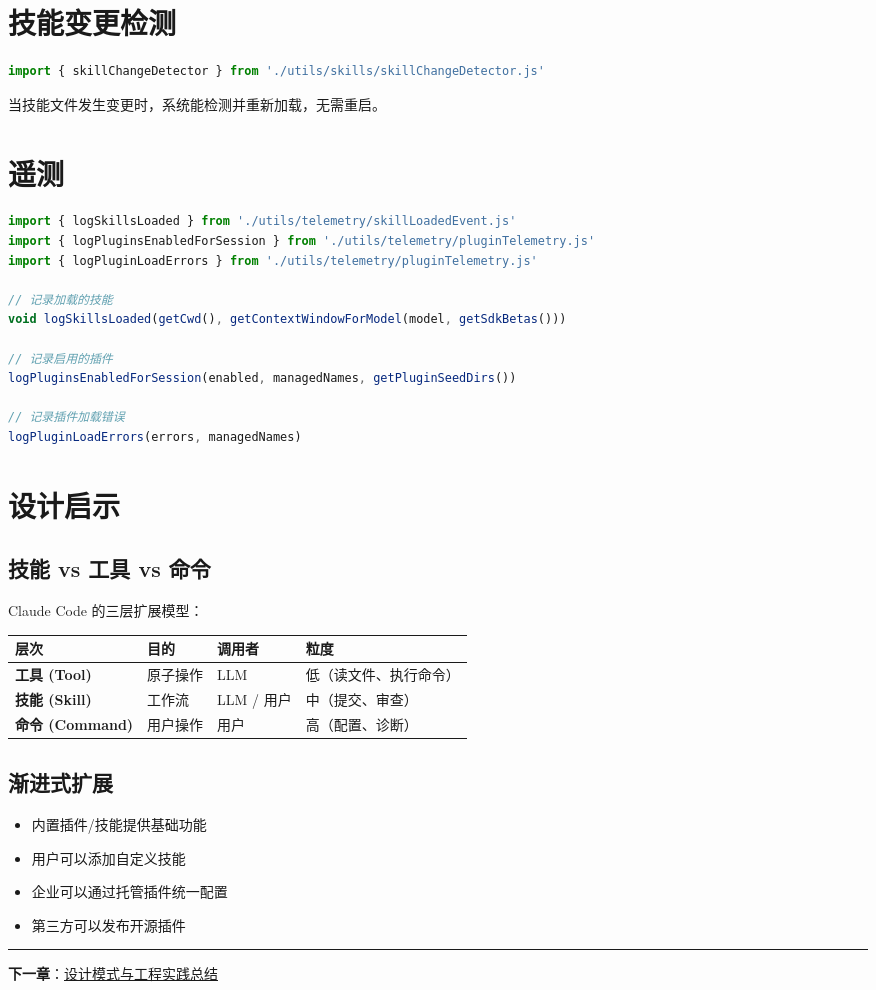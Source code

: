 \section{技能变更检测}

\begin{lstlisting}[language=TypeScript,breaklines=true]
import { skillChangeDetector } from './utils/skills/skillChangeDetector.js'
\end{lstlisting}

当技能文件发生变更时，系统能检测并重新加载，无需重启。

\section{遥测}

\begin{lstlisting}[language=TypeScript,breaklines=true]
import { logSkillsLoaded } from './utils/telemetry/skillLoadedEvent.js'
import { logPluginsEnabledForSession } from './utils/telemetry/pluginTelemetry.js'
import { logPluginLoadErrors } from './utils/telemetry/pluginTelemetry.js'

// 记录加载的技能
void logSkillsLoaded(getCwd(), getContextWindowForModel(model, getSdkBetas()))

// 记录启用的插件
logPluginsEnabledForSession(enabled, managedNames, getPluginSeedDirs())

// 记录插件加载错误
logPluginLoadErrors(errors, managedNames)
\end{lstlisting}

\section{设计启示}

\subsection{技能 vs 工具 vs 命令}

Claude Code 的三层扩展模型：

\begin{longtable}{llll}
\toprule
层次 & 目的 & 调用者 & 粒度 \\
\midrule
\textbf{工具 (Tool)} & 原子操作 & LLM & 低（读文件、执行命令） \\
\textbf{技能 (Skill)} & 工作流 & LLM / 用户 & 中（提交、审查） \\
\textbf{命令 (Command)} & 用户操作 & 用户 & 高（配置、诊断） \\
\bottomrule
\end{longtable}

\subsection{渐进式扩展}

\begin{itemize}[nosep]
  \item 内置插件/技能提供基础功能
  \item 用户可以添加自定义技能
  \item 企业可以通过托管插件统一配置
  \item 第三方可以发布开源插件
\end{itemize}

\bigskip\noindent\rule{\textwidth}{0.4pt}\bigskip

\textbf{下一章}：\href{./chapter-17-patterns.md}{设计模式与工程实践总结}
